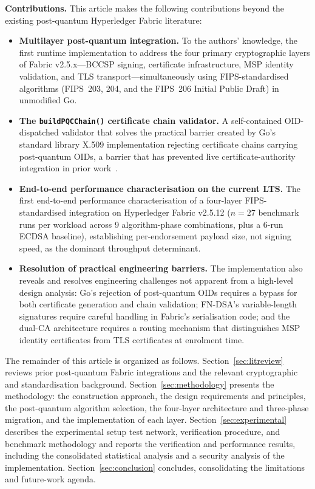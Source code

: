 \documentclass{ieeetj}
\begin{document}
\textbf{Contributions.} This article makes the following contributions beyond
the existing post-quantum Hyperledger Fabric literature:

\begin{itemize}[leftmargin=*]
\item \textbf{Multilayer post-quantum integration.} To the authors'
knowledge, the first runtime implementation to address the four primary
cryptographic layers of Fabric v2.5.x---BCCSP signing, certificate
infrastructure, MSP identity validation, and TLS transport---simultaneously
using FIPS-standardised algorithms (FIPS~203, 204, and the FIPS~206 Initial
Public Draft) in unmodified Go.

\item \textbf{The \texttt{buildPQCChain()} certificate chain validator.} A
self-contained OID-dispatched validator that solves the practical barrier
created by Go's standard library X.509 implementation rejecting certificate
chains carrying post-quantum OIDs, a barrier that has prevented live
certificate-authority integration in prior
work~\cite{holcomb2021, hu2025prototype, abbas2025}.

\item \textbf{End-to-end performance characterisation on the current LTS.}
The first end-to-end performance characterisation of a four-layer
FIPS-standardised integration on Hyperledger Fabric v2.5.12 ($n=27$ benchmark
runs per workload across 9 algorithm-phase combinations, plus a 6-run ECDSA
baseline), establishing per-endorsement payload size, not signing speed, as
the dominant throughput determinant.

\item \textbf{Resolution of practical engineering barriers.} The
implementation also reveals and resolves engineering challenges not apparent
from a high-level design analysis: Go's rejection of post-quantum OIDs
requires a bypass for both certificate generation and chain validation;
FN-DSA's variable-length signatures require careful handling in Fabric's
serialisation code; and the dual-CA architecture requires a routing
mechanism that distinguishes MSP identity certificates from TLS certificates
at enrolment time.
\end{itemize}

The remainder of this article is organized as follows.
Section~\ref{sec:litreview} reviews prior post-quantum Fabric integrations and
the relevant cryptographic and standardisation background.
Section~\ref{sec:methodology} presents the methodology: the construction
approach, the design requirements and principles, the post-quantum algorithm
selection, the four-layer architecture and three-phase migration, and the
implementation of each layer. Section~\ref{sec:experimental} describes the
experimental setup test network, verification procedure, and benchmark
methodology and reports the verification and performance results, including
the consolidated statistical analysis and a security analysis of the
implementation. Section~\ref{sec:conclusion} concludes, consolidating the
limitations and future-work agenda.
\end{document}
